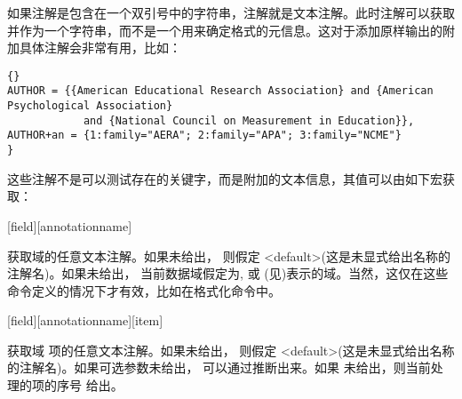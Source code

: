 如果注解是包含在一个双引号中的字符串，注解就是文本注解。此时注解可以获取并作为一个字符串，而不是一个用来确定格式的元信息。这对于添加原样输出的附加具体注解会非常有用，比如：

\begin{lstlisting}[style=bibtex]{}
AUTHOR = {{American Educational Research Association} and {American Psychological Association}
            and {National Council on Measurement in Education}},
AUTHOR+an = {1:family="AERA"; 2:family="APA"; 3:family="NCME"}
}
\end{lstlisting}
%
这些注解不是可以测试存在的关键字，而是附加的文本信息，其值可以由如下宏获取：


\begin{ltxsyntax}

[field][annotationname]

获取域的任意文本注解。如果未给出，
则假定 <default>(这是未显式给出名称的注解名)。如果未给出，
当前数据域假定为,  或  (见)表示的域。当然，这仅在这些命令定义的情况下才有效，比如在格式化命令中。

[field][annotationname][item]


获取域 项的任意文本注解。如果未给出，
则假定 <default>(这是未显式给出名称的注解名)。如果可选参数未给出，
可以通过推断出来。如果 未给出，则当前处理的项的序号 给出。


\end{ltxsyntax}
